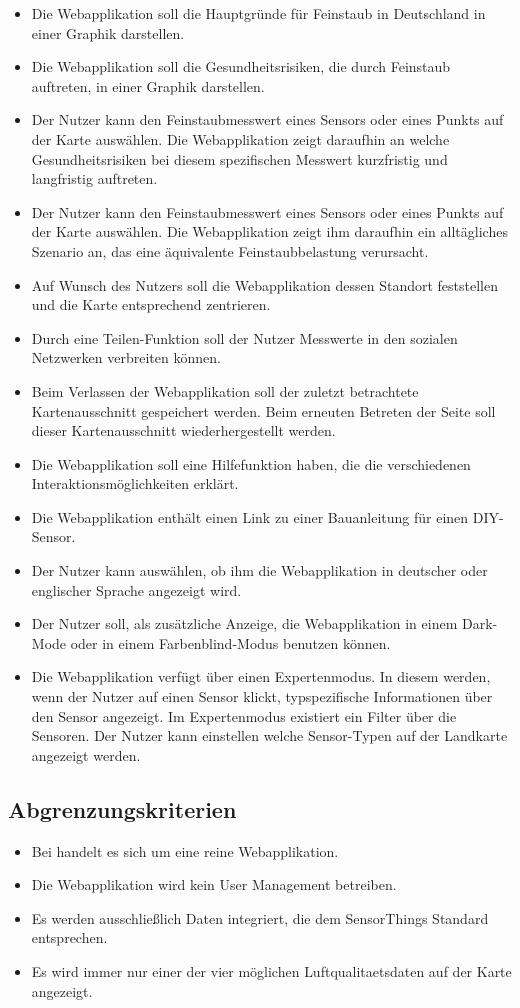    \begin{itemize}
   	\item Die Webapplikation soll die Hauptgründe für \gls{Feinstaub} in Deutschland in einer Graphik darstellen.
   	\item Die Webapplikation soll die Gesundheitsrisiken, die durch \gls{Feinstaub} auftreten, in einer Graphik darstellen. 
	\item Der Nutzer kann den \gls{Feinstaub}messwert eines Sensors oder eines Punkts auf der Karte auswählen. 
	Die Webapplikation zeigt daraufhin an welche Gesundheitsrisiken bei diesem spezifischen Messwert kurzfristig und langfristig auftreten.
	\item Der Nutzer kann den \gls{Feinstaub}messwert eines Sensors oder eines Punkts auf der Karte auswählen. 
	Die Webapplikation zeigt ihm daraufhin ein alltägliches Szenario an, das eine äquivalente \gls{Feinstaub}belastung verursacht.
	\item Auf Wunsch des Nutzers soll die Webapplikation dessen Standort feststellen und die Karte entsprechend zentrieren.
	\item Durch eine Teilen-Funktion soll der Nutzer Messwerte in den sozialen Netzwerken verbreiten können.
	\item Beim Verlassen der Webapplikation soll der zuletzt betrachtete Kartenausschnitt gespeichert werden. Beim erneuten Betreten der Seite soll dieser Kartenausschnitt wiederhergestellt werden.
	\item Die Webapplikation soll eine Hilfefunktion haben, die die verschiedenen Interaktionsmöglichkeiten erklärt.
	\item Die Webapplikation enthält einen Link zu einer Bauanleitung für einen \gls{DIY}-\gls{Sensor}.
	\item Der Nutzer kann auswählen, ob ihm die Webapplikation in deutscher oder englischer Sprache angezeigt wird.
	\item Der Nutzer soll, als zusätzliche Anzeige, die Webapplikation in einem Dark-Mode oder in einem Farbenblind-Modus benutzen können.
	\item Die Webapplikation verfügt über einen Expertenmodus. In diesem werden, wenn der Nutzer auf einen Sensor klickt, typspezifische Informationen über den \gls{Sensor} angezeigt.
	Im Expertenmodus existiert ein Filter über die Sensoren. Der Nutzer kann einstellen welche \gls{Sensor}-Typen auf der Landkarte angezeigt werden.        
\end{itemize}
\subsection{Abgrenzungskriterien}
	\begin{itemize}	
	\item Bei \softwarename handelt es sich um eine reine Webapplikation.
	\item Die Webapplikation wird kein User Management betreiben.
	\item Es werden ausschließlich Daten integriert, die dem SensorThings Standard entsprechen.	
	\item Es wird immer nur einer der vier möglichen \gls{Luftqualitaetsdaten} auf der Karte angezeigt.
\end{itemize}
